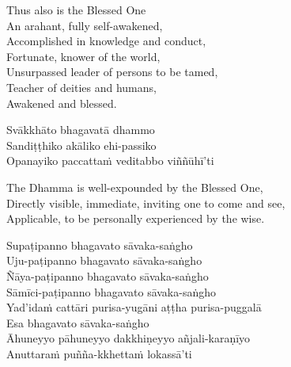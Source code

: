 \begin{english-verses}
  Thus also is the Blessed One\\
  An arahant, fully self-awakened,\\
  Accomplished in knowledge and conduct,\\
  Fortunate, knower of the world,\\
  Unsurpassed leader of persons to be tamed,\\
  Teacher of deities and humans,\\
  Awakened and blessed.
\end{english-verses}

\begin{pali-hang-continued}
  Svākkhāto bhagavatā dhammo\\
  Sandiṭṭhiko akāliko ehi-passiko\\
  Opanayiko paccattaṁ veditabbo viññūhī'ti
\end{pali-hang-continued}

\begin{english-verses}
  The Dhamma is well-expounded by the Blessed One,\\
  Directly visible, immediate, inviting one to come and see,\\
  Applicable, to be personally experienced by the wise.
\end{english-verses}

\begin{pali-hang-continued}
  Supaṭipanno bhagavato sāvaka-saṅgho\\
  Uju-paṭipanno bhagavato sāvaka-saṅgho\\
  Ñāya-paṭipanno bhagavato sāvaka-saṅgho\\
  Sāmīci-paṭipanno bhagavato sāvaka-saṅgho\\
  Yad'idaṁ cattāri purisa-yugāni aṭṭha purisa-puggalā\\
  Esa bhagavato sāvaka-saṅgho\\
  Āhuneyyo pāhuneyyo dakkhiṇeyyo añjali-karaṇīyo\\
  Anuttaraṁ puñña-kkhettaṁ lokassā'ti
\end{pali-hang-continued}

